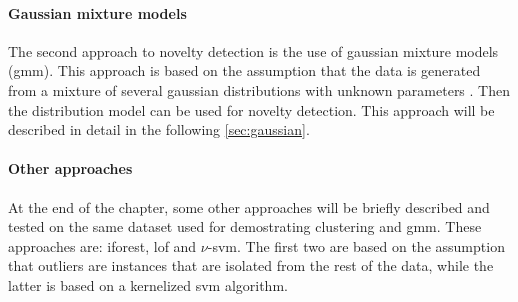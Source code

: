 \paragraph[]{Gaussian mixture models}
The second approach to novelty detection is the use of gaussian mixture models (\gls{gmm}). This approach is based on the assumption that the data is generated from a mixture of several gaussian distributions with unknown parameters . Then the distribution model can be used for novelty detection. This approach will be described in detail in the following \autoref{sec:gaussian}.

\paragraph{Other approaches}
At the end of the chapter, some other approaches will be briefly described and tested on the same dataset used for demostrating clustering and \gls{gmm}. These approaches are: \gls{iforest}, \gls{lof} and $\nu$-\gls{svm}. The first two are based on the assumption that outliers are instances that are isolated from the rest of the data, while the latter is based on a kernelized \gls{svm} algorithm. 







